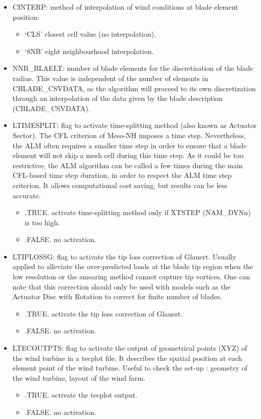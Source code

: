 \begin{itemize}
\item CINTERP: method of interpolation of wind conditions at blade element position:
\begin{itemize}
\item `CLS' closest cell value (no interpolation).
\item `8NB' eight neighbourhood interpolation.
\end{itemize}

\item NNB\_BLAELT: number of blade elements for the discretisation of the blade radius. This value is independent of the number of elements in CBLADE\_CSVDATA, as the algorithm will proceed to its own discretization through an interpolation of the data given by the blade description (CBLADE\_CSVDATA).

\item LTIMESPLIT: flag to activate time-splitting method (also known as Actuator Sector). 
The CFL criterion of Meso-NH imposes a time step. Nevertheless, the ALM often requires a smaller time step in order to ensure that a blade element will not skip a mesh cell during this time step. As it could be too restrictive, the ALM algorithm can be called a few times during the main CFL-based time step duration, in order to respect the ALM time step criterion. It allows computational cost saving, but results can be less accurate.
\begin{itemize}
\item .TRUE.  activate time-splitting method only if XTSTEP (NAM\_DYNn) is too high.
\item .FALSE. no activation.
\end{itemize}

\item LTIPLOSSG: flag to activate the tip loss correction of Glauert. 
Usually applied to alleviate the over-predicted loads at the blade tip region when the low resolution or the smearing method cannot capture tip vortices. One can note that this correction should only be used with models such as the Actuator Disc with Rotation to correct for finite number of blades.
\begin{itemize}
\item .TRUE.  activate the tip loss correction of Glauert.
\item .FALSE. no activation.
\end{itemize}

\item LTECOUTPTS: flag to activate the output of geometrical points (XYZ) of the wind turbine in a tecplot file. It describes the spatial position at each element point of the wind turbine. Useful to check the set-up : geometry of the wind turbine, layout of the wind farm. 
\begin{itemize}
\item .TRUE.  activate the tecplot output.
\item .FALSE. no activation.
\end{itemize}

\end{itemize}

